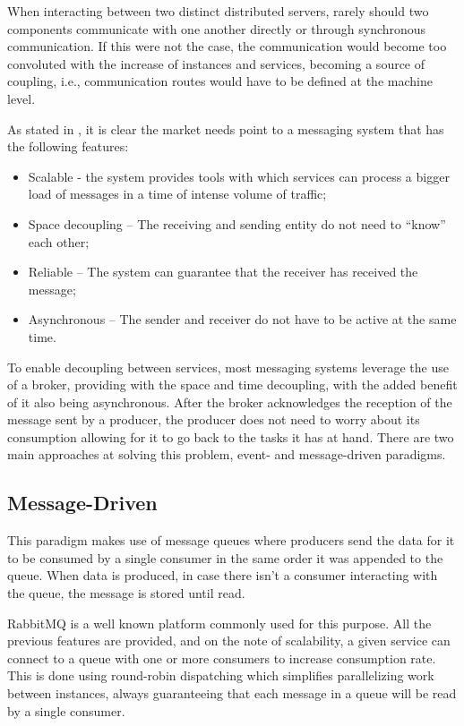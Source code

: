 When interacting between two distinct distributed servers, rarely should two
components communicate with one another directly or through synchronous
communication. If this were not the case, the communication would become too
convoluted with the increase of instances and services, becoming a source of
coupling, i.e., communication routes would have to be defined at the machine
level. 

As stated in \cite{sharvari2019study}, it is clear the market needs point to a
messaging system that has the following features:
\begin{itemize}
    \item Scalable - the system provides tools with which services can process a
        bigger load of messages in a time of intense volume of traffic;
    \item Space decoupling – The receiving and sending entity do not need to
        “know” each other;
    \item Reliable – The system can guarantee that the receiver has received the
        message;
    \item Asynchronous  – The sender and receiver do not have to be active at
        the same time.
\end{itemize}

To enable decoupling between services, most messaging systems leverage the use
of a broker, providing with the space and time decoupling, with the added
benefit of it also being asynchronous. After the broker acknowledges the
reception of the message sent by a producer, the producer does not need to
worry about its consumption allowing for it to go back to the tasks it has at
hand. There are two main approaches at solving this problem, event- and
message-driven paradigms.

\subsection{Message-Driven}

This paradigm makes use of message queues where producers send the data for it
to be consumed by a single consumer in the same order it was appended to the
queue. When data is produced, in case there isn’t a consumer interacting with
the queue, the message is stored until read. 

RabbitMQ is a well known platform commonly used for this purpose. All the
previous features are provided, and on the note of scalability, a given service
can connect to a queue with one or more consumers to increase consumption rate.
This is done using round-robin dispatching \cite{RabbitMQscale} which simplifies
parallelizing work between instances, always guaranteeing that each message in a
queue will be read by a single consumer.

